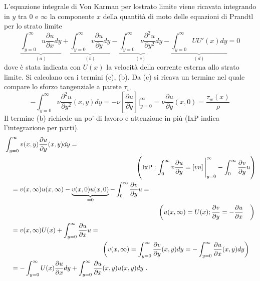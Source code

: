 
L'equazione integrale di Von Karman per lostrato limite viene ricavata integrando in $y$ tra $0$ e $\infty$ la componente $x$ della quantità di moto delle equazioni di Prandtl per lo strato limite
\begin{equation}\label{eqn:VKint}
 \underbrace{\int_{y=0}^{\infty} u \dfrac{\partial u}{\partial x} dy}_{(a)} +
 \underbrace{\int_{y=0}^{\infty} v \dfrac{\partial u}{\partial y} dy}_{(b)} -
 \underbrace{\int_{y=0}^{\infty} \nu \dfrac{\partial^2 u}{\partial y^2} dy}_{(c)} -
 \underbrace{\int_{y=0}^{\infty} U U'(x)dy}_{(d)} = 0
\end{equation}
dove è stata indicata con $U(x)$ la velocità della corrente esterna allo strato limite. Si calcolano ora i termini (c), (b). Da (c) si ricava un termine nel quale compare lo sforzo tangenziale a parete $\tau_w$
 \begin{equation}\label{eqn:VKc}
  - \int_{y=0}^{\infty} \nu \dfrac{\partial^2 u}{\partial y^2}(x,y) dy = 
  - \nu \left[ \dfrac{\partial u}{\partial y}  \right]\Bigg|_{y=0}^{\infty} =
    \nu \dfrac{\partial u}{\partial y} (x,0) = \dfrac{\tau_w(x)}{\rho}
 \end{equation}
Il termine (b) richiede un po' di lavoro e attenzione in più (IxP indica l'integrazione per parti).
\begin{equation}\label{eqn:VKb}
\begin{aligned}
 & \int_{y=0}^{\infty} v (x,y) \dfrac{\partial u}{\partial y}(x,y) dy = \\
 & \hspace{7.0cm}  \left(\text{IxP}: \int_{0}^{\infty} v \dfrac{\partial u}{\partial y} = \left[ v u \right]\Bigg|_{y=0}^{\infty} - \int_{0}^{\infty} \dfrac{\partial v}{\partial y} u \right) \\
 & \quad = v(x,\infty) u(x,\infty) - \underbrace{v(x,0) u(x,0)}_{=0} - \int_{0}^{\infty} \dfrac{\partial v}{\partial y} u = \\
 & \hspace{7.5cm}
   \qquad \left( u(x,\infty) = U(x) ; \dfrac{\partial v}{\partial y} = -\dfrac{\partial u}{\partial x}\quad \right) \\
 & \quad = v(x,\infty) U(x) + \int_{y=0}^{\infty}  \dfrac{\partial u}{\partial x} u = \\ 
 & \hspace{4.5cm} \qquad \left( v(x,\infty) = \int_{y=0}^{\infty} \dfrac{\partial v}{\partial y}(x,y) dy =-\int_{y=0}^{\infty} \dfrac{\partial u}{\partial x}(x,y) dy\right) \\
 & \quad =-\int_{y=0}^{\infty} U(x) \dfrac{\partial u}{\partial x} dy + \int_{y=0}^{\infty}  \dfrac{\partial u}{\partial x}(x,y) u(x,y) dy \ . 
\end{aligned}
\end{equation}
